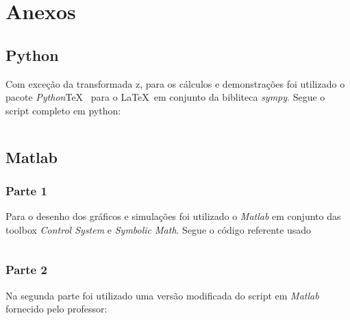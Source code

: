 \documentclass[a4paper,11pt]{article}
\begin{document}
\section*{Anexos}
\subsection*{Python}

Com exceção da transformada z, para os cálculos e demonstrações foi utilizado o pacote \textit{Python}\TeX\ \cite{pythontex} para o \LaTeX\ em conjunto da bibliteca \textit{sympy}\cite{sympy}. Segue o script completo em python:

\inputminted[xleftmargin=15pt,linenos,frame=single,framesep=5pt]{python}{../python/exsim2.py}

\newpage
\subsection*{Matlab}

\subsubsection*{Parte 1}
Para o desenho dos gráficos e simulações foi utilizado o \textit{Matlab} em conjunto das toolbox \textit{Control System}\cite{matlabcontrol} e \textit{Symbolic Math}\cite{matlabsymbolic}. Segue o código referente usado

\inputminted[xleftmargin=15pt,linenos,frame=single,framesep=5pt]{matlab}{../matlab/exsim2/exsim2.m}

\subsubsection*{Parte 2}
Na segunda parte foi utilizado uma versão modificada do script em \textit{Matlab} fornecido pelo professor:
\inputminted[xleftmargin=15pt,linenos,frame=single,framesep=5pt]{matlab}{../matlab/exsim2/exsim2script.m}



\end{document}

